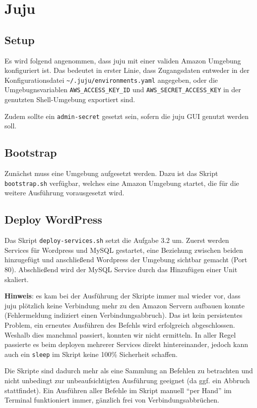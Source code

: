 \section{Juju}
\subsection{Setup}

Es wird folgend angenommen, dass juju mit einer validen Amazon Umgebung konfiguriert ist.
Das bedeutet in erster Linie, dass Zugangsdaten entweder in der Konfigurationsdatei \texttt{\textasciitilde{}/.juju/environments.yaml} angegeben, oder die Umgebugnsvariablen \texttt{AWS\_ACCESS\_KEY\_ID} und \texttt{AWS\_SECRET\_ACCESS\_KEY} in der genutzten Shell-Umgebung exportiert sind.

Zudem sollte ein \texttt{admin-secret} gesetzt sein, sofern die juju GUI genutzt werden soll.


\subsection{Bootstrap}

Zunächst muss eine Umgebung aufgesetzt werden.
Dazu ist das Skript \texttt{bootstrap.sh} verfügbar, welches eine Amazon Umgebung startet, die für die weitere Ausführung vorausgesetzt wird.


\subsection{Deploy WordPress}

Das Skript \texttt{deploy-services.sh} setzt die Aufgabe 3.2 um.
Zuerst werden Services für Wordpress und MySQL gestartet, eine Beziehung zwischen beiden hinzugefügt und anschließend Wordpress der Umgebung sichtbar gemacht (Port 80).
Abschließend wird der MySQL Service durch das Hinzufügen einer Unit skaliert.

\textbf{Hinweis}: es kam bei der Ausführung der Skripte immer mal wieder vor, dass juju plötzlich keine Verbindung mehr zu den Amazon Servern aufbauen konnte (Fehlermeldung indiziert einen Verbindungsabbruch).
Das ist kein persistentes Problem, ein erneutes Ausführen des Befehls wird erfolgreich abgeschlossen.
Weshalb dies manchmal passiert, konnten wir nicht ermitteln.
In aller Regel passierte es beim deployen mehrerer Services direkt hintereinander, jedoch kann auch ein \texttt{sleep} im Skript keine 100\% Sicherheit schaffen.

Die Skripte sind dadurch mehr als eine Sammlung an Befehlen zu betrachten und nicht unbedingt zur unbeaufsichtigten Ausführung geeignet (da ggf. ein Abbruch stattfindet).
Ein Ausführen aller Befehle im Skript manuell \enquote{per Hand} im Terminal funktioniert immer, gänzlich frei von Verbindungsabbrüchen.



